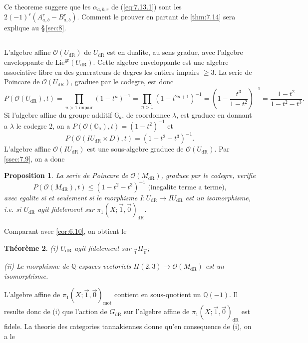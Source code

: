\documentclass[11pt,a4paper]{article}
\theoremstyle{plain}
\newtheorem{theorem}{Th\'eor\`eme}
\newtheorem{proposition}[theorem]{Proposition}
\theoremstyle{definition}
\newcommand{\Q}{\mathbb{Q}}
\newcommand{\Ga}{\mathbb{G}_a}
\newcommand{\dR}{\mathrm{dR}}
\newcommand{\mot}{\mathrm{mot}}
\newcommand{\gr}{\mathrm{gr}}
\begin{document}
Ce theoreme suggere que les $\alpha_{a,b,r}$ de (\ref{eq:7.13.1}) sont les $2(-1)^r (A_{a,b}^r - B_{a,b}^r)$. Comment le prouver en partant de \ref{thm:7.14} sera explique au \S\,\ref{sec:8}.

\subsection{}\label{ssec:7.15}

L'algebre affine $\mathcal{O}(U_{\dR})$ de $U_{\dR}$ est en dualite, au sens gradue, avec l'algebre enveloppante de $\mathrm{Lie}^{\gr}(U_{\dR})$. Cette algebre enveloppante est une algebre associative libre en des generateurs de degres les entiers impairs $\geq 3$. La serie de Poincare de $\mathcal{O}(U_{\dR})$, graduee par le codegre, est donc
\[
P(\mathcal{O}(U_{\dR}),t) = \prod_{n>1 \text{ impair}} (1 - t^n)^{-1} = \prod_{n>1} (1 - t^{2n+1})^{-1} = \left(1 - \frac{t^3}{1-t^2}\right)^{-1} = \frac{1-t^2}{1-t^2-t^3}.
\]
Si l'algebre affine du groupe additif $\Ga$, de coordonnee $\lambda$, est graduee en donnant a $\lambda$ le codegre $2$, on a $P(\mathcal{O}(\Ga),t) = (1-t^2)^{-1}$ et
\[
P(\mathcal{O}(IU_{\dR} \times D),t) = (1-t^2-t^3)^{-1}.
\]
L'algebre affine $\mathcal{O}(IU_{\dR})$ est une sous-algebre graduee de $\mathcal{O}(U_{\dR})$. Par \ref{ssec:7.9}, on a donc

\begin{proposition}\label{prop:7.16}
La serie de Poincare de $\mathcal{O}(M_{\dR})$, graduee par le codegre, verifie
\begin{equation}\label{eq:7.16.1}
P(\mathcal{O}(M_{\dR}),t) \leq (1-t^2-t^3)^{-1} \text{ (inegalite terme a terme),}
\end{equation}
avec egalite si et seulement si le morphisme $I: U_{\dR} \to IU_{\dR}$ est un isomorphisme, i.e. si $U_{\dR}$ agit fidelement sur $\pi_1(X;\vec{1},\vec{0})_{\dR}$.
\end{proposition}

Comparant avec \ref{cor:6.10}, on obtient le

\begin{theorem}\label{thm:7.17}
(i) $U_{\dR}$ agit fidelement sur ${}_{\vec{1}}\Pi_{\vec{0}}$;

(ii) Le morphisme de $\Q$-espaces vectoriels $H(2,3) \to \mathcal{O}(M_{\dR})$ est un isomorphisme.
\end{theorem}

L'algebre affine de $\pi_1(X;\vec{1},\vec{0})_{\mot}$ contient en sous-quotient un $\Q(-1)$. Il resulte donc de (i) que l'action de $G_{\dR}$ sur l'algebre affine de $\pi_1(X;\vec{1},\vec{0})_{\dR}$ est fidele. La theorie des categories tannakiennes donne qu'en consequence de (i), on a le
\end{document}
